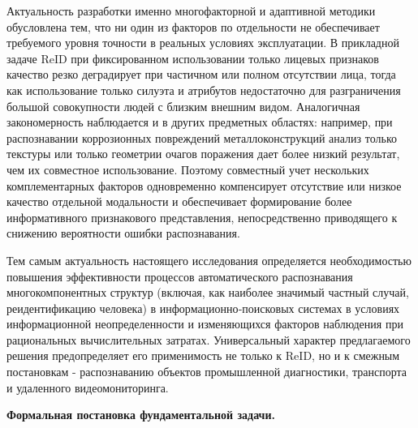 Актуальность разработки именно многофакторной и адаптивной методики
обусловлена тем, что ни один из факторов по отдельности не обеспечивает
требуемого уровня точности в реальных условиях эксплуатации.
В прикладной задаче ReID при фиксированном использовании только лицевых
признаков качество резко деградирует при частичном или полном отсутствии
лица, тогда как использование только силуэта и атрибутов недостаточно для
разграничения большой совокупности людей с близким внешним видом.
Аналогичная закономерность наблюдается и в других предметных областях:
например, при распознавании коррозионных повреждений металлоконструкций
анализ только текстуры или только геометрии очагов поражения дает
более низкий результат, чем их совместное использование. Поэтому
совместный учет нескольких комплементарных факторов одновременно
компенсирует отсутствие или низкое качество отдельной модальности и
обеспечивает формирование более информативного признакового представления,
непосредственно приводящего к снижению вероятности ошибки распознавания.

Тем самым актуальность настоящего исследования определяется необходимостью
повышения эффективности процессов автоматического распознавания
многокомпонентных структур (включая, как наиболее значимый частный случай,
реидентификацию человека) в информационно‑поисковых системах в условиях
информационной неопределенности и изменяющихся факторов наблюдения при
рациональных вычислительных затратах. Универсальный характер предлагаемого
решения предопределяет его применимость не только к ReID, но и к смежным
постановкам - распознаванию объектов промышленной диагностики, транспорта
и удаленного видеомониторинга.

\textbf{Формальная постановка фундаментальной задачи.}

